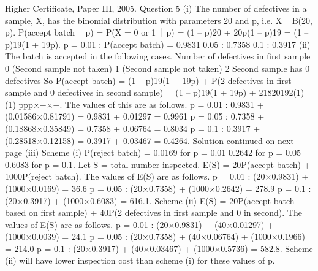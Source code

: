 Higher Certificate, Paper III, 2005. Question 5
(i) The number of defectives in a sample, X, has the binomial distribution with parameters 20 and p, i.e. X ~ B(20, p).
P(accept batch ⏐ p) = P(X = 0 or 1 ⏐ p) = (1 – p)20 + 20p(1 – p)19
= (1 – p)19(1 + 19p).
p = 0.01 : P(accept batch) = 0.9831
0.05 : 0.7358
0.1 : 0.3917
(ii) The batch is accepted in the following cases.
Number of defectives in first sample
0
(Second sample not taken)
1
(Second sample not taken)
2
Second sample has 0 defectives
So P(accept batch)
= (1 – p)19(1 + 19p)
+ P(2 defectives in first sample and 0 defectives in second sample)
= (1 – p)19(1 + 19p) + 21820192(1)(1) ppp×−×−.
The values of this are as follows.
p = 0.01 : 0.9831 + (0.01586×0.81791) = 0.9831 + 0.01297 = 0.9961
p = 0.05 : 0.7358 + (0.18868×0.35849) = 0.7358 + 0.06764 = 0.8034
p = 0.1 : 0.3917 + (0.28518×0.12158) = 0.3917 + 0.03467 = 0.4264.
Solution continued on next page
(iii)
Scheme (i) P(reject batch) = 0.0169 for p = 0.01
0.2642 for p = 0.05
0.6083 for p = 0.1.
Let S = total number inspected. E(S) = 20P(accept batch) + 1000P(reject batch).
The values of E(S) are as follows.
p = 0.01 : (20×0.9831) + (1000×0.0169) = 36.6
p = 0.05 : (20×0.7358) + (1000×0.2642) = 278.9
p = 0.1 : (20×0.3917) + (1000×0.6083) = 616.1.
Scheme (ii)
E(S) = 20P(accept batch based on first sample)
+ 40P(2 defectives in first sample and 0 in second).
The values of E(S) are as follows.
p = 0.01 : (20×0.9831) + (40×0.01297) + (1000×0.0039) = 24.1
p = 0.05 : (20×0.7358) + (40×0.06764) + (1000×0.1966) = 214.0
p = 0.1 : (20×0.3917) + (40×0.03467) + (1000×0.5736) = 582.8.
Scheme (ii) will have lower inspection cost than scheme (i) for these values of p.

